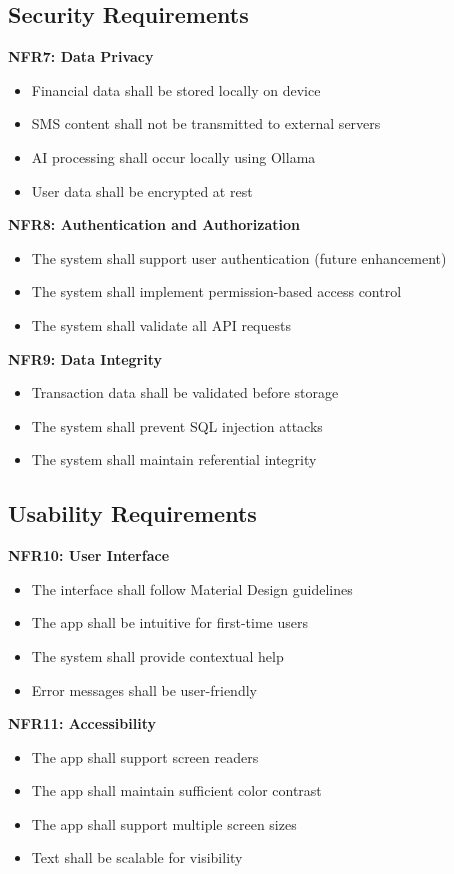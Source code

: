 \documentclass[11pt,a4paper]{report}
\begin{document}
\subsection{Security Requirements}

\textbf{NFR7: Data Privacy}
\begin{itemize}
    \item Financial data shall be stored locally on device
    \item SMS content shall not be transmitted to external servers
    \item AI processing shall occur locally using Ollama
    \item User data shall be encrypted at rest
\end{itemize}

\textbf{NFR8: Authentication and Authorization}
\begin{itemize}
    \item The system shall support user authentication (future enhancement)
    \item The system shall implement permission-based access control
    \item The system shall validate all API requests
\end{itemize}

\textbf{NFR9: Data Integrity}
\begin{itemize}
    \item Transaction data shall be validated before storage
    \item The system shall prevent SQL injection attacks
    \item The system shall maintain referential integrity
\end{itemize}

\subsection{Usability Requirements}

\textbf{NFR10: User Interface}
\begin{itemize}
    \item The interface shall follow Material Design guidelines
    \item The app shall be intuitive for first-time users
    \item The system shall provide contextual help
    \item Error messages shall be user-friendly
\end{itemize}

\textbf{NFR11: Accessibility}
\begin{itemize}
    \item The app shall support screen readers
    \item The app shall maintain sufficient color contrast
    \item The app shall support multiple screen sizes
    \item Text shall be scalable for visibility
\end{itemize}
\end{document}
